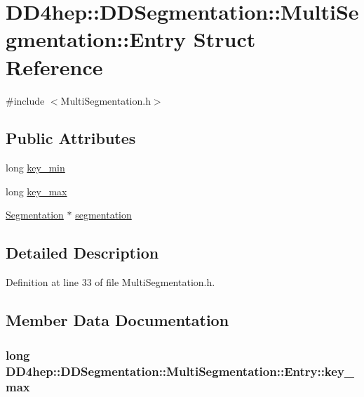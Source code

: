 \hypertarget{struct_d_d4hep_1_1_d_d_segmentation_1_1_multi_segmentation_1_1_entry}{
\section{DD4hep::DDSegmentation::MultiSegmentation::Entry Struct Reference}
\label{struct_d_d4hep_1_1_d_d_segmentation_1_1_multi_segmentation_1_1_entry}
}


{\ttfamily \#include $<$MultiSegmentation.h$>$}\subsection*{Public Attributes}
\begin{DoxyCompactItemize}
\item 
long \hyperlink{struct_d_d4hep_1_1_d_d_segmentation_1_1_multi_segmentation_1_1_entry_a45ab402e1cc51a736d358270935ce0b1}{key\_\-min}
\item 
long \hyperlink{struct_d_d4hep_1_1_d_d_segmentation_1_1_multi_segmentation_1_1_entry_af019d706caaf4aa334dd6c264bfe36cc}{key\_\-max}
\item 
\hyperlink{class_d_d4hep_1_1_d_d_segmentation_1_1_segmentation}{Segmentation} $\ast$ \hyperlink{struct_d_d4hep_1_1_d_d_segmentation_1_1_multi_segmentation_1_1_entry_a1850766ca41dccd7dfdc11806d4eef34}{segmentation}
\end{DoxyCompactItemize}


\subsection{Detailed Description}


Definition at line 33 of file MultiSegmentation.h.

\subsection{Member Data Documentation}
\hypertarget{struct_d_d4hep_1_1_d_d_segmentation_1_1_multi_segmentation_1_1_entry_af019d706caaf4aa334dd6c264bfe36cc}{
\subsubsection[{key\_\-max}]{\setlength{\rightskip}{0pt plus 5cm}long {\bf DD4hep::DDSegmentation::MultiSegmentation::Entry::key\_\-max}}}
\label{struct_d_d4hep_1_1_d_d_segmentation_1_1_multi_segmentation_1_1_entry_af019d706caaf4aa334dd6c264bfe36cc}


